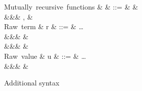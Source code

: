 \begin{figure}
\begin{syntaxfig}
\mbox{Mutually recursive functions}
&
\delta
&
::=
&
\seqEmpty
&
\\
&&&
, \delta
&
\\[2mm]
\mbox{Raw term}
&
r
&
::=
&
\ldots
\\
&&&
\exLambda{\sigma}
&
\\
&&&
&
\\[2mm]
\mbox{Raw value}
&
u
&
::=
&
\ldots
\\
&&&
\exClosure{\rho}{\delta}{\sigma}
&
\end{syntaxfig}
\caption{Additional syntax}
\end{figure}
